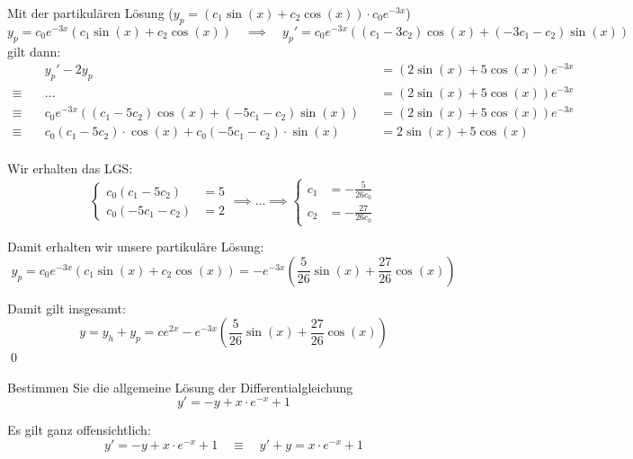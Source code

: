 \documentclass[answers]{exam}
\begin{document}
\begin{questions}
\begin{solution}
        Mit der partikulären Lösung ($y_p = (c_1\sin(x) + c_2\cos(x))\cdot c_0e^{-3x}$)
        $$
            y_p = c_0e^{-3x}(c_1\sin(x) + c_2\cos(x)) \quad \implies \quad y_p' = c_0 e^{-3 x} ((c_1 - 3 c_2) \cos(x) + (-3 c_1 - c_2) \sin(x))
        $$
        gilt dann:
        $$
            \begin{aligned}
                             & y_p' - 2y_p                                                 &  & = (2\sin(x) + 5\cos(x)) e^{-3x} \\
                \equiv \quad & \ldots                                                      &  & = (2\sin(x) + 5\cos(x)) e^{-3x} \\
                \equiv \quad & c_0 e^{-3 x} ((c_1-5c_2)\cos(x) + (-5c_1 -c_2)\sin(x))      &  & = (2\sin(x) + 5\cos(x)) e^{-3x} \\
                \equiv \quad & c_0(c_1-5c_2) \cdot \cos(x) + c_0(-5c_1 -c_2) \cdot \sin(x) &  & = 2\sin(x) + 5\cos(x)           \\
            \end{aligned}
        $$

        Wir erhalten das LGS:
        $$
            \begin{cases}
                c_0(c_1 -5c_2)   & = 5 \\
                c_0(-5c_1 - c_2) & = 2
            \end{cases}
            \implies
            \ldots
            \implies
            \begin{cases}
                c_1 & = -\frac{5}{26c_0}  \\
                c_2 & = -\frac{27}{26c_0}
            \end{cases}
        $$

        Damit erhalten wir unsere partikuläre Lösung:
        $$
            y_p = c_0e^{-3x}(c_1\sin(x) + c_2\cos(x)) = -e^{-3x}\left(\frac{5}{26}\sin(x) + \frac{27}{26}\cos(x)\right)
        $$

        Damit gilt insgesamt:
        $$
            y = y_h + y_p = ce^{2x} - e^{-3x}\left(\frac{5}{26}\sin(x) + \frac{27}{26}\cos(x)\right)
        $$\qed
    \end{solution}

    \newpage
    \question
    Bestimmen Sie die allgemeine Lösung der Differentialgleichung
    $$
        y' = -y + x\cdot e^{-x} + 1
    $$
    \begin{solution}
        Es gilt ganz offensichtlich:
        $$
            y' = -y + x\cdot e^{-x} + 1 \quad \equiv \quad y'  + y = x\cdot e^{-x} + 1
        $$


\end{solution}
\end{questions}
\end{document}
